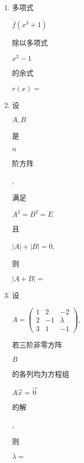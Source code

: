 \documentclass[10pt]{article}
\begin{document}
\begin{enumerate}
  \item \begin{CJK}{UTF8}{mj}多项式\end{CJK} $f\left(x^{3}+1\right)$ \begin{CJK}{UTF8}{mj}除以多项式\end{CJK} $x^{2}-1$ \begin{CJK}{UTF8}{mj}的余式\end{CJK} $r(x)=$

  \item \begin{CJK}{UTF8}{mj}设\end{CJK} $A, B$ \begin{CJK}{UTF8}{mj}是\end{CJK} $n$ \begin{CJK}{UTF8}{mj}阶方阵\end{CJK}, \begin{CJK}{UTF8}{mj}满足\end{CJK} $A^{2}=B^{2}=E$ \begin{CJK}{UTF8}{mj}且\end{CJK} $|A|+|B|=0$, \begin{CJK}{UTF8}{mj}则\end{CJK} $|A+B|=$

  \item \begin{CJK}{UTF8}{mj}设\end{CJK} $A=\left(\begin{array}{ccc}1 & 2 & -2 \\ 2 & -1 & \lambda \\ 3 & 1 & -1\end{array}\right)$, \begin{CJK}{UTF8}{mj}若三阶非零方阵\end{CJK} $B$ \begin{CJK}{UTF8}{mj}的各列均为方程组\end{CJK} $A \vec{x}=\overrightarrow{0}$ \begin{CJK}{UTF8}{mj}的解\end{CJK}, \begin{CJK}{UTF8}{mj}则\end{CJK} $\lambda=$


\end{enumerate}
\end{document}
